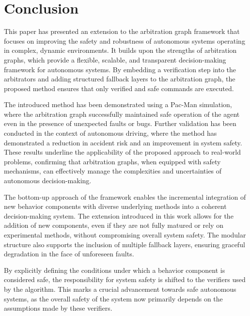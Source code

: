 \section{Conclusion}
This paper has presented an extension to the arbitration graph framework that focuses on improving the safety and robustness of autonomous systems operating in complex, dynamic environments.
It builds upon the strengths of arbitration graphs, which provide a flexible, scalable, and transparent decision-making framework for autonomous systems.
By embedding a verification step into the arbitrators and adding structured fallback layers to the arbitration graph,
the proposed method ensures that only verified and safe commands are executed.

The introduced method has been demonstrated using a Pac-Man simulation, where the arbitration graph successfully maintained safe operation of the agent even in the presence of unexpected faults or bugs.
Further validation has been conducted in the context of autonomous driving, where the method has demonstrated a reduction in accident risk and an improvement in system safety.
These results underline the applicability of the proposed approach to real-world problems,
confirming that arbitration graphs, when equipped with safety mechanisms,
can effectively manage the complexities and uncertainties of autonomous decision-making.

The bottom-up approach of the framework enables the incremental integration of new behavior components with diverse underlying methods into a coherent decision-making system.
The extension introduced in this work allows for the addition of new components, even if they are not fully matured or rely on experimental methods, without compromising overall system safety.
The modular structure also supports the inclusion of multiple fallback layers, ensuring graceful degradation in the face of unforeseen faults.

By explicitly defining the conditions under which a behavior component is considered safe,
the responsibility for system safety is shifted to the verifiers used by the algorithm.
This marks a crucial advancement towards safe autonomous systems, as
the overall safety of the system now primarily depends on the assumptions made by these verifiers.

